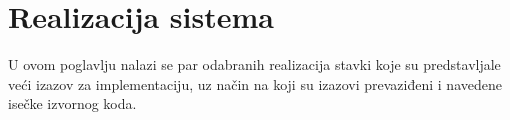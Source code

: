 \chapter{Realizacija sistema}\label{realizacija}
U ovom poglavlju nalazi se par odabranih realizacija stavki koje su predstavljale veći izazov za implementaciju, uz način na koji su izazovi prevaziđeni i navedene isečke izvornog koda.